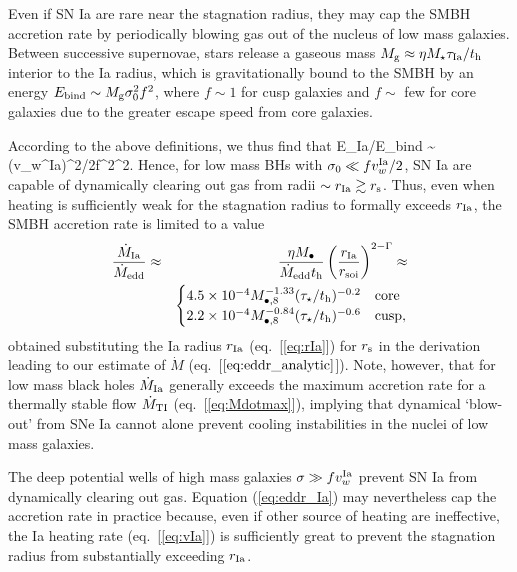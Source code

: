\documentclass[usenatbib,fleqn]{mn2e}
\newcommand{\Mbheight}{M_{\bullet,8}}
\begin{document}

Even if SN Ia are rare near the stagnation radius, they may cap the
SMBH accretion rate by periodically blowing gas out of the nucleus of
low mass galaxies.  Between successive supernovae, stars release a
gaseous mass $M_{\rm g} \approx \eta M_{\star}\tau_{\rm Ia}/t_{\rm h}$
interior to the Ia radius, which is gravitationally bound to the SMBH
by an energy $E_{\rm bind} \sim M_{\rm g}\sigma_0^{2}f^{2}$, where $f \sim 1$ for cusp galaxies and $f \sim$ few for core galaxies due to the greater escape speed from core galaxies.  

According
to the above definitions, we thus find that 
\be
E_{\rm Ia}/E_{\rm bind} \sim (v_{w}^{\rm Ia})^{2}/2f^{2}\sigma^{2}.  
\ee
Hence, for low mass BHs with $\sigma_0 \ll f v^{\rm Ia}_{w}/2$, SN Ia are capable of dynamically clearing out gas from radii $\sim r_{\rm Ia} \gtrsim r_{\rm s}$.  Thus, even when heating is sufficiently weak for the stagnation radius to formally exceeds $r_{\rm Ia}$, the SMBH accretion rate is limited to a value
\begin{eqnarray}
\frac{\dot{M}_{\rm Ia}}{\dot{M}_{\rm edd}} &\approx& \frac{\eta M_{\bullet}}{\dot{M}_{\rm edd} t_{\rm h}}\left(\frac{r_{\rm Ia}}{r_{\rm soi}}\right)^{2-\Gamma} \approx \nonumber \\
 && \begin{cases}
    4.5 \times 10^{-4} M_{\bullet,8}^{-1.33}(\tau_{\star}/t_{\rm h})^{-0.2}
   & \text{core} \\
    2.2 \times 10^{-4} \Mbheight^{-0.84}(\tau_{\star}/t_{\rm h})^{-0.6}   & \text{cusp},
  \end{cases}
  \label{eq:eddr_Ia}
\end{eqnarray}
obtained substituting the Ia radius $r_{\rm Ia}$ (eq.~[\ref{eq:rIa}]) for $r_{\rm s}$ in the derivation leading to our estimate of $\dot{M}$ (eq.~[$\ref{eq:eddr_analytic}$]).  Note, however, that for low mass black holes $\dot{M}_{\rm Ia}$ generally exceeds the maximum accretion rate for a thermally stable flow $\dot{M}_{\rm TI}$ (eq.~[\ref{eq:Mdotmax}]), implying that dynamical `blow-out' from SNe Ia cannot alone prevent cooling instabilities in the nuclei of low mass galaxies.  

The deep potential wells of high mass galaxies $\sigma \gg f v^{\rm Ia}_{w}$ prevent SN Ia from dynamically clearing out gas.  Equation (\ref{eq:eddr_Ia}) may nevertheless cap the accretion rate in practice because, even if other source of heating are ineffective, the Ia heating rate (eq.~[\ref{eq:vIa}]) is sufficiently great to prevent the stagnation radius from substantially exceeding $r_{\rm Ia}$.
\end{document}
